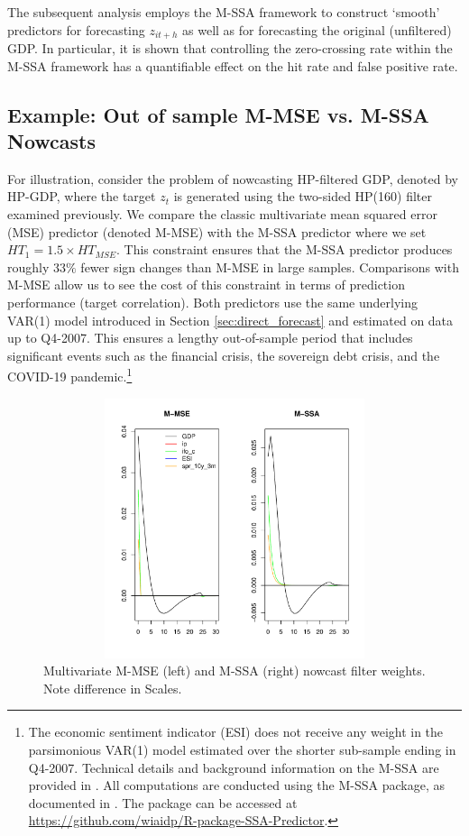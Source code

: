 \documentclass[11pt,a4paper]{article}
\begin{document}
The subsequent analysis employs the M-SSA framework to construct `smooth' predictors for forecasting $z_{it+h}$ as well as for forecasting the original (unfiltered) GDP. In particular, it is shown that controlling the zero-crossing rate within the M-SSA framework has a quantifiable effect on the hit rate and false positive rate.

 
 

\subsection{Example: Out of sample M-MSE vs. M-SSA Nowcasts}

For illustration, consider the problem of nowcasting HP-filtered GDP, denoted by HP-GDP, where the target $z_t$ is generated using the two-sided HP(160) filter examined previously. We compare the classic multivariate mean squared error (MSE) predictor (denoted M-MSE) with the M-SSA predictor where we set $HT_1=1.5\times HT_{MSE}$. This constraint ensures that the M-SSA predictor produces roughly 33$\%$ fewer sign changes than M-MSE in large samples. Comparisons with M-MSE allow us to see the cost of this constraint in terms of prediction performance (target correlation). 
Both predictors use the same underlying VAR(1) model introduced in Section \ref{sec:direct_forecast} and estimated on data up to Q4-2007. This ensures a lengthy out-of-sample period that includes significant events such as the financial crisis, the sovereign debt crisis, and the COVID-19 pandemic.\footnote{The economic sentiment indicator (ESI) does not receive any weight in the parsimonious VAR(1) model estimated over the shorter sub-sample ending in Q4-2007. Technical details and background information on the M-SSA are provided in \cite{Wildi2025}. All computations are conducted using the M-SSA package, as documented in \cite{Wildi2025}. The package can be accessed at \url{https://github.com/wiaidp/R-package-SSA-Predictor}.}

\begin{figure}[htpb]
    \begin{center}
        \includegraphics[height=3in, width=4.5in]{./Figures/bk_gammak.pdf}
        \caption{Multivariate M-MSE (left) and M-SSA (right) nowcast filter weights.\\
        Note difference in Scales.
        \label{bk_gammak}}
    \end{center}
\end{figure}
\end{document}
